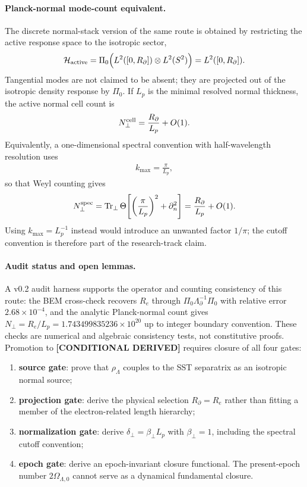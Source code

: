 \paragraph{Planck-normal mode-count equivalent.}
The discrete normal-stack version of the same route is obtained by
restricting the active response space to the isotropic sector,
\begin{align}
    \mathcal H_{\rm active}
    =
    \Pi_0\Big(L^2([0,R_\partial])\otimes L^2(S^2)\Big)
    =
    L^2([0,R_\partial]) .
\end{align}
Tangential modes are not claimed to be absent; they are projected out of
the isotropic density response by \(\Pi_0\).  If \(L_p\) is the minimal
resolved normal thickness, the active normal cell count is
\begin{align}
    N_\perp^{\rm cell}
    =
    \frac{R_\partial}{L_p}+O(1).
\end{align}
Equivalently, a one-dimensional spectral convention with half-wavelength
resolution uses
\begin{align}
    k_{\max}=\frac{\pi}{L_p},
\end{align}
so that Weyl counting gives
\begin{align}
    N_\perp^{\rm spec}
    =
    \operatorname{Tr}_\perp
    \Theta\!\left[
        \left(\frac{\pi}{L_p}\right)^2+\partial_n^2
    \right]
    =
    \frac{R_\partial}{L_p}+O(1).
\end{align}
Using \(k_{\max}=L_p^{-1}\) instead would introduce an unwanted factor
\(1/\pi\); the cutoff convention is therefore part of the research-track
claim.

\paragraph{Audit status and open lemmas.}
A v0.2 audit harness supports the operator and counting consistency of
this route: the BEM cross-check recovers \(R_e\) through
\(\Pi_0\Lambda_\partial^{-1}\Pi_0\) with relative error
\(2.68\times10^{-4}\), and the analytic Planck-normal count gives
\(N_\perp=R_e/L_p=1.743499835236\times10^{20}\) up to integer
boundary convention.  These checks are numerical and algebraic consistency
tests, not constitutive proofs.  Promotion to \textbf{[CONDITIONAL DERIVED]} requires closure of all four gates:
\begin{enumerate}
    \item \textbf{source gate}: prove that \(\rho_\Lambda\) couples to the SST
    separatrix as an isotropic normal source;
    \item \textbf{projection gate}: derive the physical selection
    \(R_\partial=R_e\) rather than fitting a member of the electron-related
    length hierarchy;
    \item \textbf{normalization gate}: derive
    \(\delta_\perp=\beta_\perp L_p\) with \(\beta_\perp=1\), including
    the spectral cutoff convention;
    \item \textbf{epoch gate}: derive an epoch-invariant closure functional.
    The present-epoch number \(2\Omega_{\Lambda,0}\) cannot serve as a
    dynamical fundamental closure.
\end{enumerate}



